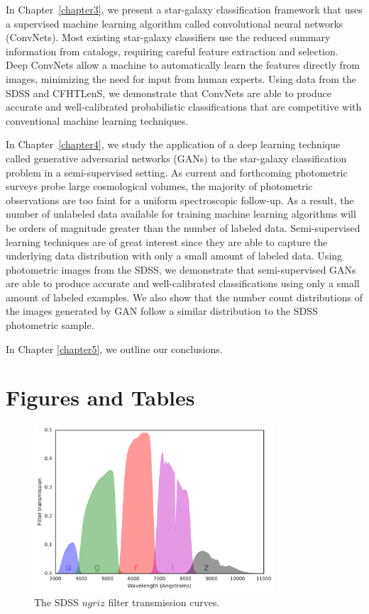 In Chapter~\ref{chapter3}, we present a star-galaxy classification framework that uses a supervised machine learning algorithm called
convolutional neural networks (ConvNets).
Most existing star-galaxy classifiers use the reduced summary information from catalogs,
requiring careful feature extraction and selection.
Deep ConvNets allow a machine to automatically learn the features directly from images,
minimizing the need for input from human experts.
Using data from the SDSS and CFHTLenS,
we demonstrate that ConvNets are able to produce accurate and well-calibrated probabilistic classifications that are competitive with
conventional machine learning techniques.

In Chapter~\ref{chapter4}, we study the application of a deep learning technique called generative adversarial networks (GANs)
to the star-galaxy classification problem in a semi-supervised setting.
As current and forthcoming photometric surveys probe large cosmological volumes,
the majority of photometric observations are too faint for a uniform spectroscopic follow-up.
As a result, the number of unlabeled data available for training machine learning algorithms will be orders of magnitude
greater than the number of labeled data.
Semi-supervised learning techniques are of great interest since they are able to capture the underlying data distribution
with only a small amount of labeled data.
Using photometric images from the SDSS, we demonstrate that semi-supervised GANs are able to produce
accurate and well-calibrated classifications using only a small amount of labeled examples.
We also show that the number count distributions of the images generated by GAN follow a similar distribution to
the SDSS photometric sample.

In Chapter \ref{chapter5}, we outline our conclusions.

\newpage
\section{Figures and Tables}

\vspace{100pt}

\begin{figure}[htp]
  \centering
  \includegraphics[width=0.8\textwidth]{figures/filters.pdf}
  \caption{The SDSS $ugriz$ filter transmission curves.}
  \label{fig:filters}
\end{figure}

